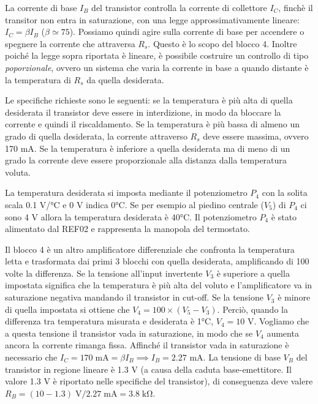 La corrente di base $I_B$ del transistor controlla la corrente di collettore $I_C$, finchè il transitor non entra in saturazione,
con una legge approssimativamente lineare: $I_C = \beta I_B$ ($\beta \simeq 75$). Possiamo quindi agire sulla corrente di base
per accendere o spegnere la corrente che attraversa $R_s$. Questo è lo scopo del blocco 4. Inoltre poiché la legge sopra riportata
è lineare, è possibile costruire un controllo di tipo \emph{poporzionale}, ovvero un sistema che varia la corrente in base a quando
distante è la temperatura di $R_s$ da quella desiderata.

Le specifiche richieste sono le seguenti: se la temperatura è più alta di quella desiderata il transistor deve essere in interdizione,
in modo da bloccare la corrente e quindi il riscaldamento. Se la temperatura è più bassa di almeno un grado di quella desiderata,
la corrente attraverso $R_s$ deve essere massima, ovvero 170 mA. Se la temperatura è inferiore a quella desiderata ma di meno di un grado
la corrente deve essere proporzionale alla distanza dalla temperatura voluta.

La temperatura desiderata si imposta mediante il potenziometro $P_4$ con la solita scala 0.1 V/\si{\celsius} e 0 V indica 0\si{\celsius}.
Se per esempio al piedino centrale ($V_5$) di $P_4$ ci sono 4 V allora la temperatura desiderata è 40\si{\celsius}. Il potenziometro $P_4$
è stato alimentato dal REF02 e rappresenta la manopola del termostato.

Il blocco 4 è un altro amplificatore differenziale che confronta la temperatura letta e trasformata dai primi 3 blocchi con quella desiderata,
amplificando di 100 volte la differenza. Se la tensione all'input invertente $V_3$ è superiore a quella impostata significa che la temperatura
è più alta del voluto e l'amplificatore va in saturazione negativa mandando il transistor in cut-off. Se la tensione $V_3$ è minore
di quella impostata si ottiene che $V_4 = 100\times(V_5 - V_3)$. Perciò, quando la differenza tra temperatura misurata e desiderata è 1\si{\celsius},
$V_4 = 10$ V. Vogliamo che a questa tensione il transistor vada in saturazione, in modo che se $V_4$ aumenta ancora la corrente rimanga fissa.
Affinché il transistor vada in saturazione è necessario che $I_C = 170 \;\si{\milli\ampere} = \beta I_B \implies I_B = 2.27$ mA.
La tensione di base $V_B$ del transistor in regione lineare è 1.3 V (a causa della caduta base-emettitore. Il valore 1.3 V è
riportato nelle specifiche del transistor), di conseguenza deve valere $R_B = (10 - 1.3) \;\si{\volt} / 2.27\;\si{\milli\ampere} = 3.8\;\si{\kilo\ohm}$.

